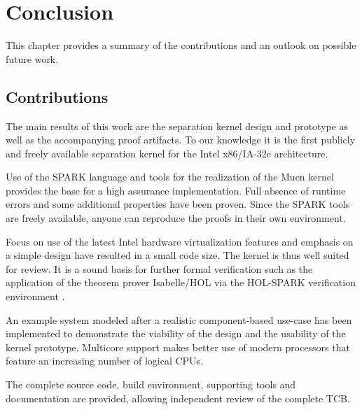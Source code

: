 \chapter{Conclusion}
This chapter provides a summary of the contributions and an outlook on possible
future work.

\section{Contributions}
The main results of this work are the separation kernel design and prototype as
well as the accompanying proof artifacts. To our knowledge it is the first
publicly and freely available separation kernel for the Intel
x86/IA-32e architecture.

Use of the SPARK language and tools for the realization of the Muen kernel
provides the base for a high assurance implementation. Full absence of
runtime errors and some additional properties have been proven. Since the SPARK
tools are freely available, anyone can reproduce the proofs in their own
environment.

Focus on use of the latest Intel hardware virtualization features and emphasis
on a simple design have resulted in a small code size. The kernel is thus well
suited for review. It is a sound basis for further formal verification such as
the application of the theorem prover Isabelle/HOL via the HOL-SPARK
verification environment \cite{berghofer:OASIcs:2012:3587}.

An example system modeled after a realistic component-based use-case has been
implemented to demonstrate the viability of the design and the usability of the
kernel prototype. Multicore support makes better use of modern processors that
feature an increasing number of logical CPUs.

The complete source code, build environment, supporting tools and documentation
are provided, allowing independent review of the complete TCB.


